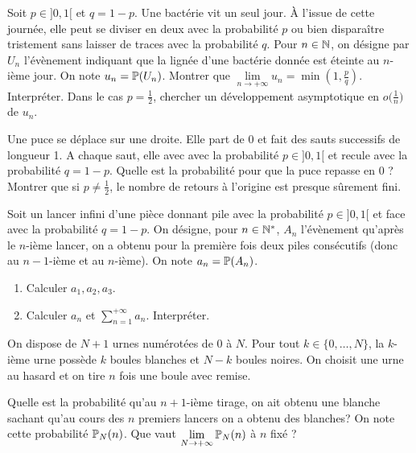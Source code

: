 \documentclass[12pt]{article}
\begin{document}
\begin{exercise}
	Soit $p\in]0,1[$ et $q=1-p$. Une bactérie vit un seul jour. \`A l'issue de
	cette journée, elle peut se diviser en deux avec la probabilité $p$ ou bien
	disparaître tristement sans laisser de traces avec la probabilité $q$. Pour
	$n\in\N$, on désigne par $U_{n}$ l'évènement indiquant que la lignée d'une
	bactérie donnée est éteinte au $n$-ième jour. On note $u_{n}=\P(U_{n})$.
	Montrer que $\lim\limits_{n\to+\infty}u_{n}=\min(1,\frac{p}{q})$. Interpréter.
	Dans le cas $p=\frac{1}{2}$, chercher un développement asymptotique en
	$o\bigl(\frac{1}{n}\bigr)$ de $u_{n}$.
\end{exercise}

\begin{exercise}
	Une puce se déplace sur une droite. Elle part de 0 et fait des sauts
	successifs de longueur 1. A chaque saut, elle avec avec la probabilité
	$p\in]0,1[$ et recule avec la probabilité $q=1-p$. Quelle est la probabilité
	pour que la puce repasse en 0 ? Montrer que si $p\neq\frac{1}{2}$, le nombre
	de retours à l'origine est presque sûrement fini.
\end{exercise}

\begin{exercise}
	Soit un lancer infini d'une pièce donnant pile avec la probabilité $p\in]0,1[$
	et face avec la probabilité $q=1-p$. On désigne, pour $n\in\N^{*}$, $A_{n}$
	l'évènement qu'après le $n$-ième lancer, on a obtenu pour la première fois
	deux piles consécutifs (donc au $n-1$-ième et au $n$-ième). On note
	$a_{n}=\P(A_{n})$.
	
	\begin{enumerate}
		\item
		Calculer $a_{1},a_{2},a_{3}$.
		\item
		Calculer $a_{n}$ et $\sum_{n=1}^{+\infty}a_{n}$. Interpréter.
	\end{enumerate}
\end{exercise}

\begin{exercise}
	On dispose de $N+1$ urnes numérotées de $0$ à $N$. Pour tout
	$k\in\{0,\dots,N\}$, la $k$-ième urne possède $k$ boules blanches et $N-k$
	boules noires. On choisit une urne au hasard et on tire $n$ fois une boule
	avec remise.

	Quelle est la probabilité qu'au $n+1$-ième tirage, on ait obtenu une
	blanche sachant qu'au cours des $n$ premiers lancers on a obtenu des
	blanches? On note cette probabilité $\P_{N}(n)$.
	Que vaut $\lim\limits_{N\to+\infty}\P_{N}(n)$ à $n$ fixé ?
\end{exercise}
\end{document}
